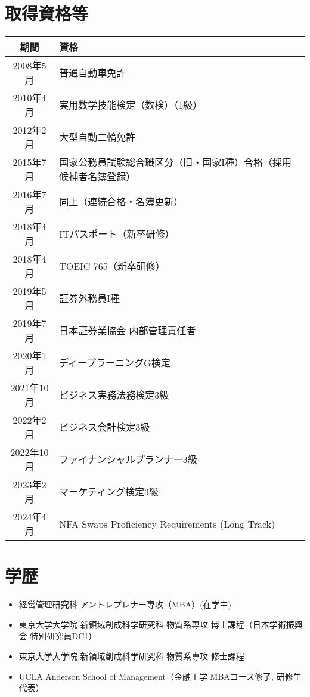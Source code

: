 \documentclass[uplatex,a4j,10.5pt,dvipdfmx]{jsarticle}
\begin{document}
\section{取得資格等}

\begin{longtable}{|c|l|}
	\hline
	\centering\textbf{期間} & \textbf{資格}                                     \\
	\hline
	\endhead

	\hline
	2008年5月               & 普通自動車免許                                         \\
	\hline
	2010年4月               & 実用数学技能検定（数検）（1級）                                \\
	\hline
	2012年2月               & 大型自動二輪免許                                        \\
	\hline
	2015年7月               & 国家公務員試験総合職区分（旧・国家I種）合格（採用候補者名簿登録）               \\
	\hline
	2016年7月               & 同上（連続合格・名簿更新）                                   \\
	\hline
	2018年4月               & ITパスポート（新卒研修）                                   \\
	\hline
	2018年4月               & TOEIC 765（新卒研修）                                 \\
	\hline
	2019年5月               & 証券外務員I種                                         \\
	\hline
	2019年7月               & 日本証券業協会 内部管理責任者                                 \\
	\hline
	2020年1月               & ディープラーニングG検定                                    \\
	\hline
	2021年10月              & ビジネス実務法務検定3級                                    \\
	\hline
	2022年2月               & ビジネス会計検定3級                                      \\
	\hline
	2022年10月              & ファイナンシャルプランナー3級                                 \\
	\hline
	2023年2月               & マーケティング検定3級                                     \\
	\hline
	2024年4月               & NFA Swaps Proficiency Requirements (Long Track) \\
	\hline
\end{longtable}

\section{学歴}
\begin{itemize}
	\item 経営管理研究科 アントレプレナー専攻（MBA）(在学中)
	\item 東京大学大学院 新領域創成科学研究科 物質系専攻 博士課程（日本学術振興会 特別研究員DC1）
	\item 東京大学大学院 新領域創成科学研究科 物質系専攻 修士課程
	\item UCLA Anderson School of Management（金融工学 MBAコース修了, 研修生代表）
\end{itemize}
\end{document}
